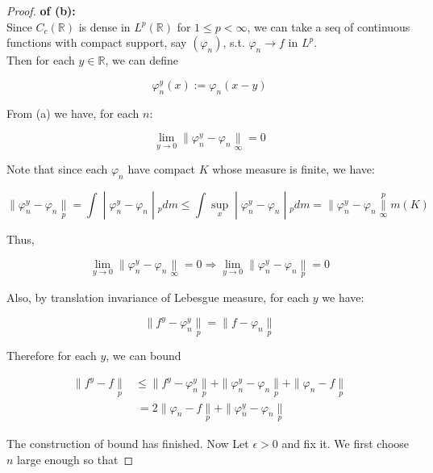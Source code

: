 \documentclass{qlnotes-export}
\begin{document}
\begin{proof}

\textbf{of (b):}\\
Since \(C_{c}({\mathbb{R}})\) is dense in \(L^{p}({\mathbb{R}})\) for \(1 \leq p < \infty\), we can take a seq of continuous functions with compact support, say \((\varphi_{n})\), s.t. \(\varphi_{n}\rightarrow f\) in \(L^{p}\).\\
Then for each \(y \in {\mathbb{R}}\), we can define

\[\varphi_{n}^{y}(x) := \varphi_{n}(x - y)\]

From (a) we have, for each \(n\):

\[\lim\limits_{y\rightarrow 0} \parallel \varphi_{n}^{y} - \varphi_{n}\underset{\infty}{\parallel} = 0\]

Note that since each \(\varphi_{n}\) have compact \(K\) whose measure is finite, we have:

\[\left. \parallel \varphi_{n}^{y} - \varphi_{n}\underset{p}{\parallel} = \int \middle| \varphi_{n}^{y} - \varphi_{n} \middle| {}_{p} dm \leq \int\sup\limits_{x} \middle| \varphi_{n}^{y} - \varphi_{n} \middle| {}_{p} dm = \parallel \varphi_{n}^{y} - \varphi_{n}\underset{\infty}{\overset{p}{\parallel}}m(K) \right.\]

Thus,

\[\lim\limits_{y\rightarrow 0} \parallel \varphi_{n}^{y} - \varphi_{n}\underset{\infty}{\parallel} = 0\Longrightarrow\lim\limits_{y\rightarrow 0} \parallel \varphi_{n}^{y} - \varphi_{n}\underset{p}{\parallel} = 0\]

Also, by translation invariance of Lebesgue measure, for each \(y\) we have:

\[\parallel f^{y} - \varphi_{n}^{y}\underset{p}{\parallel} = \parallel f - \varphi_{n}\underset{p}{\parallel}\]

Therefore for each \(y\), we can bound

\[\begin{matrix}
{\parallel f^{y} - f\underset{p}{\parallel}} & {\leq \parallel f^{y} - \varphi_{n}^{y}\underset{p}{\parallel} + \parallel \varphi_{n}^{y} - \varphi_{n}\underset{p}{\parallel} + \parallel \varphi_{n} - f\underset{p}{\parallel}} \\
 & {\  = 2 \parallel \varphi_{n} - f\underset{p}{\parallel} + \parallel \varphi_{n}^{y} - \varphi_{n}\underset{p}{\parallel}}
\end{matrix}\]

The construction of bound has finished. Now Let \(\epsilon > 0\) and fix it. We first choose \(n\) large enough so that


\end{proof}
\end{document}
